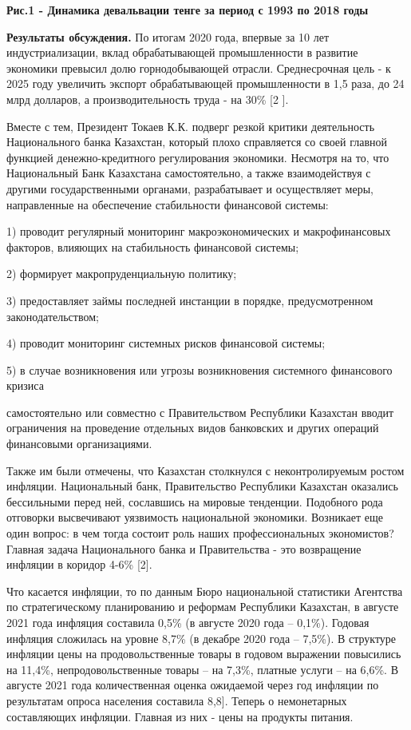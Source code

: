 {\bfseries Рис.1 - Динамика девальвации тенге за период с 1993 по 2018
годы}

{\bfseries Результаты обсуждения.} По итогам 2020 года, впервые за 10 лет
индустриализации, вклад обрабатывающей промышленности в развитие
экономики превысил долю горнодобывающей отрасли. Среднесрочная цель - к
2025 году увеличить экспорт обрабатывающей промышленности в 1,5 раза, до
24 млрд долларов, а производительность труда - на 30\% {[}2 {]}.

Вместе с тем, Президент Токаев К.К. подверг резкой критики деятельность
Национального банка Казахстан, который плохо справляется со своей
главной функцией денежно-кредитного регулирования экономики. Несмотря на
то, что Национальный Банк Казахстана самостоятельно, а также
взаимодействуя с другими государственными органами, разрабатывает и
осуществляет меры, направленные на обеспечение стабильности финансовой
системы:

1) проводит регулярный мониторинг макроэкономических и макрофинансовых
факторов, влияющих на стабильность финансовой системы;

2) формирует макропруденциальную политику;

3) предоставляет займы последней инстанции в порядке, предусмотренном
законодательством;

4) проводит мониторинг системных рисков финансовой системы;

5) в случае возникновения или угрозы возникновения системного
финансового кризиса

самостоятельно или совместно с Правительством Республики Казахстан
вводит ограничения на проведение отдельных видов банковских и других
операций финансовыми организациями.

Также им были отмечены, что Казахстан столкнулся с неконтролируемым
ростом инфляции. Национальный банк, Правительство Республики Казахстан
оказались бессильными перед ней, сославшись на мировые тенденции.
Подобного рода отговорки высвечивают уязвимость национальной экономики.
Возникает еще один вопрос: в чем тогда состоит роль наших
профессиональных экономистов? Главная задача Национального банка и
Правительства - это возвращение инфляции в коридор 4-6\% {[}2{]}.

Что касается инфляции, то по данным Бюро национальной статистики
Агентства по стратегическому планированию и реформам Республики
Казахстан, в августе 2021 года инфляция составила 0,5\% (в августе 2020
года -- 0,1\%). Годовая инфляция сложилась на уровне 8,7\% (в декабре
2020 года -- 7,5\%). В структуре инфляции цены на продовольственные
товары в годовом выражении повысились на 11,4\%, непродовольственные
товары -- на 7,3\%, платные услуги -- на 6,6\%. В августе 2021 года
количественная оценка ожидаемой через год инфляции по результатам опроса
населения составила 8,8{]}. Теперь о немонетарных составляющих инфляции.
Главная из них - цены на продукты питания.

